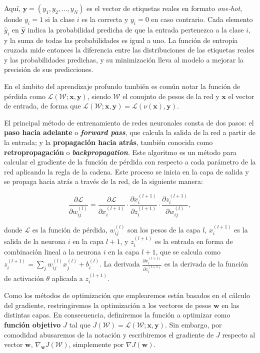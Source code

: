 Aquí, \(\mathbf{y} = (y_1, y_2, \ldots, y_N)\) es el vector de etiquetas reales en formato \textit{one-hot}, donde \(y_i = 1\) si la clase \(i\) es la correcta y \(y_i = 0\) en caso contrario. Cada elemento \(\hat{y}_i\) en \(\mathbf{\hat{y}}\) indica la probabilidad predicha de que la entrada pertenezca a la clase \(i\), y la suma de todas las probabilidades es igual a uno. La función de entropía cruzada mide entonces la diferencia entre las distribuciones de las etiquetas reales y las probabilidades predichas, y su minimización lleva al modelo a mejorar la precisión de sus predicciones.

En el ámbito del aprendizaje profundo también es común notar la función de pérdida como \(\mathcal{L}(\mathcal{W};\mathbf{x}, \mathbf{y})\), siendo \(\mathcal{W}\) el conujnto de pesos de la red y \(\mathbf{x}\) el vector de entrada, de forma que \(\mathcal{L}(\mathcal{W};\mathbf{x}, \mathbf{y}) = \mathcal{L}(\nu(\mathbf{x}), \mathbf{y})\).

El principal método de entrenamiento de redes neuronales consta de dos pasos: el \textbf{paso hacia adelante} o \textbf{\textit{forward pass}}, que calcula la salida de la red a partir de la entrada; y la \textbf{propagación hacia atrás}, también conocida como \textbf{retropropagación} o \textbf{\textit{backpropagation}}. Este algoritmo es un método para calcular el gradiente de la función de pérdida con respecto a cada parámetro de la red aplicando la regla de la cadena. Este proceso se inicia en la capa de salida y se propaga hacia atrás a través de la red, de la siguiente manera:

\[
\frac{\partial \mathcal{L}}{\partial w_{ij}^{(l)}} = \frac{\partial \mathcal{L}}{\partial x_i^{(l+1)}} \cdot \frac{\partial x_i^{(l+1)}}{\partial z_i^{(l+1)}} \cdot \frac{\partial z_i^{(l+1)}}{\partial w_{ij}^{(l)}},
\]

donde \( \mathcal{L} \) es la función de pérdida, \( w_{ij}^{(l)} \) son los pesos de la capa \( l \), \( x_i^{(l+1)} \) es la salida de la neurona \( i \) en la capa \( l+1 \), y \( z_i^{(l+1)} \) es la entrada en forma de combinación lineal a la neurona \( i \) en la capa \( l+1 \), que se calcula como \( z_i^{(l+1)} = \sum_j w_{ij}^{(l)} x_j^{(l)} + b_i^{(l)} \). La derivada \(\frac{\partial x_i^{(l+1)}}{\partial z_i^{(l+1)}}\) es la derivada de la función de activación \(\theta\) aplicada a \( z_i^{(l+1)} \).

Como los métodos de optimización que emplearemos están basados en el cálculo del gradiente, restringiremos la optimización a los vectores de pesos \(\mathbf{w}\) en las distintas capas. En consecuencia, definiremos la función a optimizar como \textbf{función objetivo} \(J\) tal que \(J(\mathcal{W}) = \mathcal{L}(\mathcal{W};\mathbf{x}, \mathbf{y})\). Sin embargo, por comodidad abusaremos de la notación y escribiremos el gradiente de \(J\) respecto al vector \(\mathbf{w}\), \(\nabla_{\mathbf{w}} J(\mathcal{W})\), simplemente por \(\nabla J(\mathbf{w})\).

